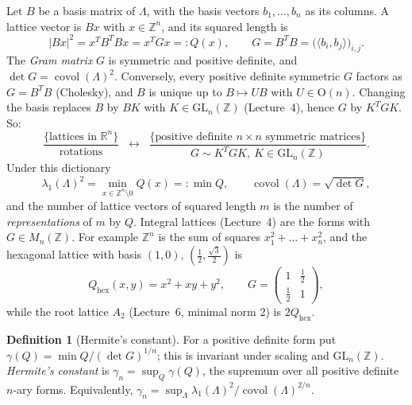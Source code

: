 \documentclass[11pt,openany]{book}
\theoremstyle{plain}
\theoremstyle{definition}
\newtheorem{definition}[theorem]{Definition}
\theoremstyle{remark}
\newcommand{\R}{\mathbb{R}}
\newcommand{\Z}{\mathbb{Z}}
\newcommand{\Lat}{\Lambda}             %
\newcommand{\covol}{\operatorname{covol}}
\newcommand{\GL}{\mathrm{GL}}
\newcommand{\Orth}{\mathrm{O}}
\newcommand{\abs}[1]{\left\lvert #1 \right\rvert}
\newcommand{\ip}[2]{\langle #1, #2\rangle}
\begin{document}
Let $B$ be a basis matrix of $\Lat$, with the basis vectors $b_1,\dots,b_n$ as its columns. A lattice
vector is $Bx$ with $x\in\Z^n$, and its squared length is
\[
  \abs{Bx}^2=x^TB^TBx=x^TGx=:Q(x),\qquad G=B^TB=\big(\ip{b_i}{b_j}\big)_{i,j}.
\]
The \emph{Gram matrix} $G$ is symmetric and positive definite, and $\det G=\covol(\Lat)^2$. Conversely,
every positive definite symmetric $G$ factors as $G=B^TB$ (Cholesky), and $B$ is unique up to
$B\mapsto UB$ with $U\in\Orth(n)$. Changing the basis replaces $B$ by $BK$ with $K\in\GL_n(\Z)$
(Lecture~4), hence $G$ by $K^TGK$. So:
\[
  \frac{\{\text{lattices in }\R^n\}}{\text{rotations}}
  \;\;\longleftrightarrow\;\;
  \frac{\{\text{positive definite }n\times n\text{ symmetric matrices}\}}{G\sim K^TGK,\ K\in\GL_n(\Z)} .
\]
Under this dictionary
\[
  \lambda_1(\Lat)^2=\min_{x\in\Z^n\setminus0}Q(x)=:\min Q,\qquad \covol(\Lat)=\sqrt{\det G},
\]
and the number of lattice vectors of squared length $m$ is the number of \emph{representations} of $m$
by $Q$. Integral lattices (Lecture~4) are the forms with $G\in M_n(\Z)$. For example $\Z^n$ is the sum
of squares $x_1^2+\dots+x_n^2$, and the hexagonal lattice with basis $(1,0)$,
$(\tfrac12,\tfrac{\sqrt3}2)$ is
\[
  Q_{\mathrm{hex}}(x,y)=x^2+xy+y^2,\qquad G=\begin{pmatrix}1&\tfrac12\\ \tfrac12&1\end{pmatrix},
\]
while the root lattice $A_2$ (Lecture~6, minimal norm $2$) is $2Q_{\mathrm{hex}}$.

\begin{definition}[Hermite's constant]\label{NT:def:hermite}
For a positive definite form put $\gamma(Q)=\min Q/(\det G)^{1/n}$; this is invariant under scaling and
$\GL_n(\Z)$. \emph{Hermite's constant} is $\gamma_n=\sup_Q\gamma(Q)$, the supremum over all positive
definite $n$-ary forms. Equivalently, $\gamma_n=\sup_\Lat\lambda_1(\Lat)^2/\covol(\Lat)^{2/n}$.
\end{definition}
\end{document}
